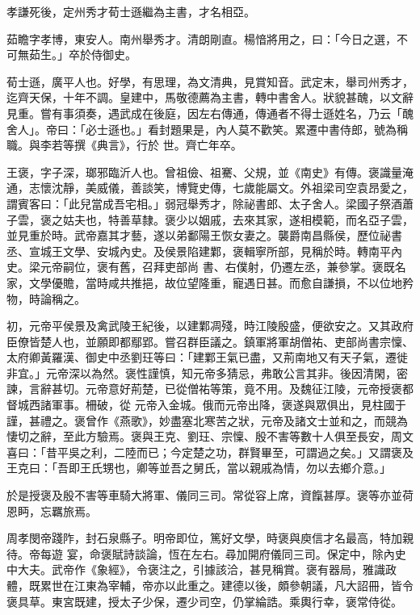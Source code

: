 \begin{pinyinscope}
 孝謙死後，定州秀才荀士遜繼為主書，才名相亞。



 茹瞻字孝博，東安人。南州舉秀才。清朗剛直。楊愔將用之，曰：「今日之選，不可無茹生。」卒於侍御史。



 荀士遜，廣平人也。好學，有思理，為文清典，見賞知音。武定末，舉司州秀才，迄齊天保，十年不調。皇建中，馬敬德薦為主書，轉中書舍人。狀貌甚醜，以文辭見重。嘗有事須奏，遇武成在後庭，因左右傳通，傳通者不得士遜姓名，乃云「醜舍人」。帝曰：「必士遜也。」看封題果是，內人莫不歡笑。累遷中書侍郎，號為稱職。與李若等撰《典言》，行於
 世。齊亡年卒。



 王褒，字子深，瑯邪臨沂人也。曾祖儉、祖騫、父規，並《南史》有傳。褒識量淹通，志懷沈靜，美威儀，善談笑，博覽史傳，七歲能屬文。外祖梁司空袁昂愛之，謂賓客曰：「此兒當成吾宅相。」弱冠舉秀才，除祕書郎、太子舍人。梁國子祭酒蕭子雲，褒之姑夫也，特善草隸。褒少以姻戚，去來其家，遂相模範，而名亞子雲，並見重於時。武帝嘉其才藝，遂以弟鄱陽王恢女妻之。襲爵南昌縣侯，歷位祕書丞、宣城王文學、安城內史。及侯景陷建鄴，褒輯寧所部，見稱於時。轉南平內史。梁元帝嗣位，褒有舊，召拜吏部尚
 書、右僕射，仍遷左丞，兼參掌。褒既名家，文學優贍，當時咸共推挹，故位望隆重，寵遇日甚。而愈自謙損，不以位地矜物，時論稱之。



 初，元帝平侯景及禽武陵王紀後，以建鄴凋殘，時江陵殷盛，便欲安之。又其政府臣僚皆楚人也，並願即都鄢郢。嘗召群臣議之。鎮軍將軍胡僧祐、吏部尚書宗懍、太府卿黃羅漢、御史中丞劉玨等曰：「建鄴王氣已盡，又荊南地又有天子氣，遷徙非宜。」元帝深以為然。褒性謹慎，知元帝多猜忌，弗敢公言其非。後因清閑，密諫，言辭甚切。元帝意好荊楚，已從僧祐等策，竟不用。及魏征江陵，元帝授褒都督城西諸軍事。柵破，從
 元帝入金城。俄而元帝出降，褒遂與眾俱出，見柱國于謹，甚禮之。褒曾作《燕歌》，妙盡塞北寒苦之狀，元帝及諸文士並和之，而競為悽切之辭，至此方驗焉。褒與王克、劉玨、宗懍、殷不害等數十人俱至長安，周文喜曰：「昔平吳之利，二陸而已；今定楚之功，群賢畢至，可謂過之矣。」又謂褒及王克曰：「吾即王氏甥也，卿等並吾之舅氏，當以親戚為情，勿以去鄉介意。」



 於是授褒及殷不害等車騎大將軍、儀同三司。常從容上席，資餼甚厚。褒等亦並荷恩眄，忘羈旅焉。



 周孝閔帝踐阼，封石泉縣子。明帝即位，篤好文學，時褒與庾信才名最高，特加親待。帝每遊
 宴，命褒賦詩談論，恆在左右。尋加開府儀同三司。保定中，除內史中大夫。武帝作《象經》，令褒注之，引據該洽，甚見稱賞。褒有器局，雅識政體，既累世在江東為宰輔，帝亦以此重之。建德以後，頗參朝議，凡大詔冊，皆令褒具草。東宮既建，授太子少保，遷少司空，仍掌綸誥。乘輿行幸，褒常侍從。




\end{pinyinscope}
